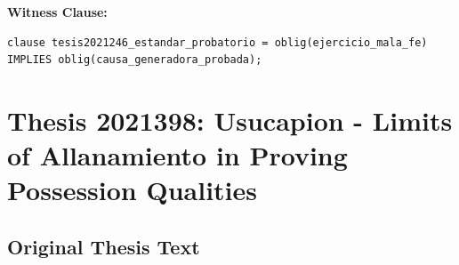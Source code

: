 \documentclass[11pt,a4paper]{article}
\begin{document}
\textbf{Witness Clause:}

\begin{lstlisting}[style=witnessstyle, language=Witness]
clause tesis2021246_estandar_probatorio = oblig(ejercicio_mala_fe) IMPLIES oblig(causa_generadora_probada);
\end{lstlisting}

\newpage

\section{Thesis 2021398: Usucapion - Limits of Allanamiento in Proving Possession Qualities}
\label{thesis:2021398}

\subsection{Original Thesis Text}
\end{document}
